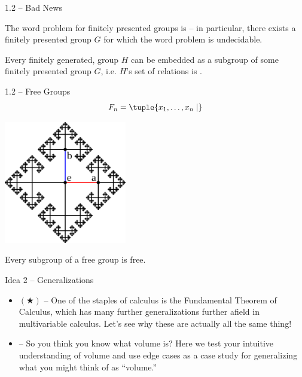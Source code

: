 \documentclass{beamer}
\theoremstyle{plain}
\begin{document}
\begin{frame}{1.2 -- Bad News}
  \begin{theorem}
  The word problem for finitely presented groups is  -- in
  particular, there exists a finitely presented group $G$ for which the word
  problem is undecidable. 
\end{theorem}
\pause
  \begin{theorem}
  Every finitely generated,  group $H$ can be embedded as a
 subgroup of some finitely presented group $G$, i.e. $H$'s
 set of relations is . 
\end{theorem}
\end{frame}

\begin{frame}{1.2 -- Free Groups}
 \[
   F_n = \tuple{x_1, \dots, x_n \mid }
 \]
 \begin{center}
   \includegraphics[width=0.4\textwidth]{cayley-graph-F_2.png} 
 \end{center}
 \pause
 \begin{theorem}
   Every subgroup of a free group is free. 
 \end{theorem}
\end{frame}
\begin{frame}{Idea 2 -- Generalizations}
 \begin{itemize}
   \item $(\bigstar)$  -- One of the staples of calculus is the Fundamental
    Theorem of Calculus, which has many further generalizations further afield
    in multivariable calculus. Let's see why these are actually all the same
    thing! 

  \item {} -- So you
    think you know what volume is? Here we test your intuitive understanding of
    volume and use edge cases as a case study for generalizing what you might
    think of as ``volume.'' 
 \end{itemize} 
\end{frame}
\end{document}
